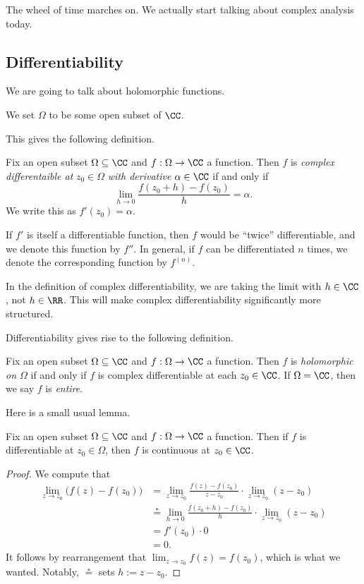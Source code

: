 
The wheel of time marches on. We actually start talking about complex analysis today.

\subsection{Differentiability}
We are going to talk about holomorphic functions.
\begin{convention}
	We set $\Omega$ to be some open subset of $\CC$.
\end{convention}
This gives the following definition.
\begin{definition}[Differentiable]
	Fix an open subset $\Omega\subseteq\CC$ and $f:\Omega\to\CC$ a function. Then $f$ is \textit{complex differentaible at} $z_0\in\Omega$ \textit{with derivative} $\alpha\in\CC$ if and only if
	\[\lim_{h\to0}\frac{f(z_0+h)-f(z_0)}h=\alpha.\]
	We write this as $f'(z_0)=\alpha$.
\end{definition}
If $f'$ is itself a differentiable function, then $f$ would be ``twice'' differentiable, and we denote this function by $f''$. In general, if $f$ can be differentiated $n$ times, we denote the corresponding function by $f^{(n)}$.
\begin{warn}
	In the definition of complex differentiability, we are taking the limit with $h\in\CC$, not $h\in\RR$. This will make complex differentiability significantly more structured.
\end{warn}
Differentiability gives rise to the following definition.
\begin{definition}
	Fix an open subset $\Omega\subseteq\CC$ and $f:\Omega\to\CC$ a function. Then $f$ is \textit{holomorphic on $\Omega$} if and only if $f$ is complex differentiable at each $z_0\in\CC$. If $\Omega=\CC$, then we say $f$ is \textit{entire}.
\end{definition}
Here is a small usual lemma.
\begin{lemma}
	Fix an open subset $\Omega\subseteq\CC$ and $f:\Omega\to\CC$ a function. Then if $f$ is differentiable at $z_0\in\Omega$, then $f$ is continuous at $z_0\in\CC$.
\end{lemma}
\begin{proof}
	We compute that
	\begin{align*}
		\lim_{z\to z_0}\big(f(z)-f(z_0)\big) &= \lim_{z\to z_0}\frac{f(z)-f(z_0)}{z-z_0}\cdot\lim_{z\to z_0}(z-z_0) \\
		&\stackrel*= \lim_{h\to0}\frac{f(z_0+h)-f(z_0)}h\cdot\lim_{z\to z_0}(z-z_0) \\
		&= f'(z_0)\cdot0 \\
		&= 0.
	\end{align*}
	It follows by rearrangement that $\lim_{z\to z_0}f(z)=f(z_0)$, which is what we wanted. Notably, $\stackrel*=$ sets $h:=z-z_0$.
\end{proof}

